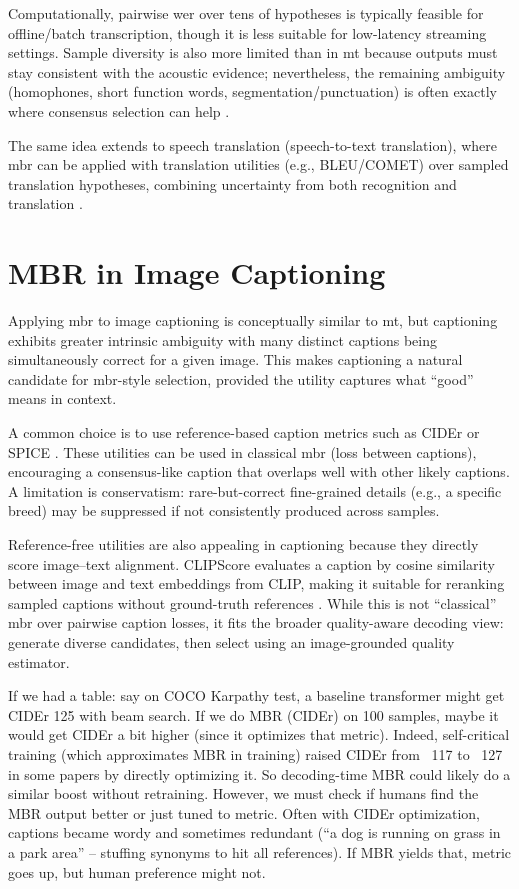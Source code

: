 Computationally, pairwise \gls{wer} over tens of hypotheses is typically feasible for offline/batch transcription, though it is less suitable for low-latency streaming settings. Sample diversity is also more limited than in \gls{mt} because outputs must stay consistent with the acoustic evidence; nevertheless, the remaining ambiguity (homophones, short function words, segmentation/punctuation) is often exactly where consensus selection can help \cite{jinnai2025mbr_asr}.

The same idea extends to speech translation (speech-to-text translation), where \gls{mbr} can be applied with translation utilities (e.g., BLEU/COMET) over sampled translation hypotheses, combining uncertainty from both recognition and translation \cite{jinnai2025mbr_asr}.



\section{MBR in Image Captioning}

Applying \gls{mbr} to image captioning is conceptually similar to \gls{mt}, but captioning exhibits greater intrinsic ambiguity with many distinct captions being simultaneously correct for a given image. This makes captioning a natural candidate for \gls{mbr}-style selection, provided the utility captures what “good” means in context.

A common choice is to use reference-based caption metrics such as CIDEr or SPICE \cite{vedantam2015cider,anderson2016spice}. These utilities can be used in classical \gls{mbr} (loss between captions), encouraging a consensus-like caption that overlaps well with other likely captions. A limitation is conservatism: rare-but-correct fine-grained details (e.g., a specific breed) may be suppressed if not consistently produced across samples.

Reference-free utilities are also appealing in captioning because they directly score image--text alignment. CLIPScore evaluates a caption by cosine similarity between image and text embeddings from CLIP, making it suitable for reranking sampled captions without ground-truth references \cite{hessel-etal-2021-clipscore,radford2021clip}. While this is not “classical” \gls{mbr} over pairwise caption losses, it fits the broader quality-aware decoding view: generate diverse candidates, then select using an image-grounded quality estimator.



\iffalse
If we had a table: say on COCO Karpathy test, a baseline transformer might get CIDEr 125 with beam search. If we do MBR (CIDEr) on 100 samples, maybe it would get CIDEr a bit higher (since it optimizes that metric). Indeed, self-critical training (which approximates MBR in training) raised CIDEr from ~117 to ~127 in some papers by directly optimizing it. So decoding-time MBR could likely do a similar boost without retraining. However, we must check if humans find the MBR output better or just tuned to metric. Often with CIDEr optimization, captions became wordy and sometimes redundant (“a dog is running on grass in a park area” – stuffing synonyms to hit all references). If MBR yields that, metric goes up, but human preference might not.

